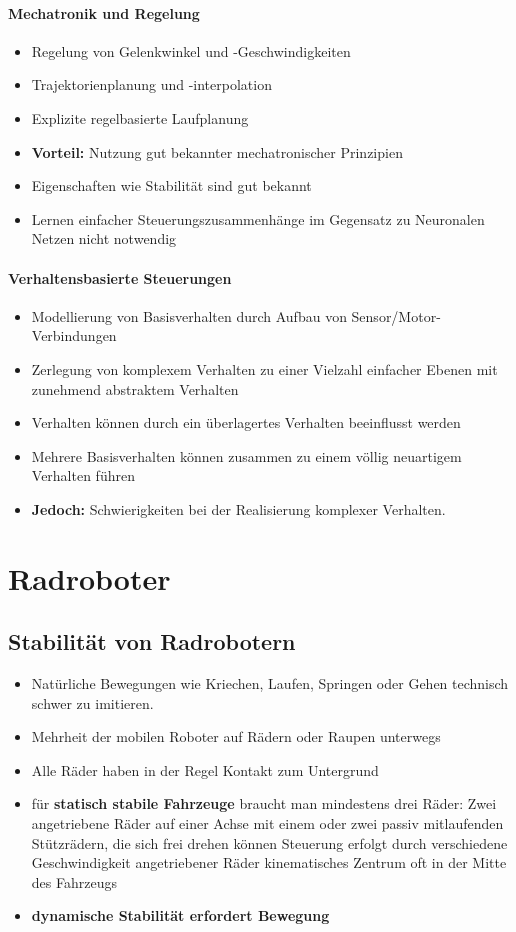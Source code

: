 \paragraph{Mechatronik und Regelung}
\begin{itemize}
	\item Regelung von Gelenkwinkel und -Geschwindigkeiten
	\item Trajektorienplanung und -interpolation
	\item Explizite regelbasierte Laufplanung
	\item \textbf{Vorteil:} Nutzung gut bekannter mechatronischer Prinzipien
	\item Eigenschaften wie Stabilität sind gut bekannt
	\item Lernen einfacher Steuerungszusammenhänge im Gegensatz zu Neuronalen Netzen nicht notwendig
\end{itemize}
\paragraph{Verhaltensbasierte Steuerungen}
\begin{itemize}
	\item Modellierung von Basisverhalten durch Aufbau von Sensor/Motor-Verbindungen
	\item Zerlegung von komplexem Verhalten zu einer Vielzahl einfacher Ebenen mit zunehmend abstraktem Verhalten
	\item Verhalten können durch ein überlagertes Verhalten beeinflusst werden
	\item Mehrere Basisverhalten können zusammen zu einem völlig neuartigem Verhalten führen
	\item \textbf{Jedoch:} Schwierigkeiten bei der Realisierung komplexer Verhalten.
\end{itemize}
\section{Radroboter}
\subsection{Stabilität von Radrobotern}
\begin{itemize}
	\item Natürliche Bewegungen wie Kriechen, Laufen, Springen oder Gehen technisch schwer zu imitieren.
	\item Mehrheit der mobilen Roboter auf Rädern oder Raupen unterwegs
	\item Alle Räder haben in der Regel Kontakt zum Untergrund
	\item für \textbf{statisch stabile Fahrzeuge} braucht man mindestens drei Räder:
	\subitem Zwei angetriebene Räder auf einer Achse mit einem oder zwei passiv mitlaufenden Stützrädern, die sich frei drehen können
	\subitem Steuerung erfolgt durch verschiedene Geschwindigkeit angetriebener Räder
	\subitem kinematisches Zentrum oft in der Mitte des Fahrzeugs
	\item \textbf{dynamische Stabilität erfordert Bewegung}
\end{itemize}
